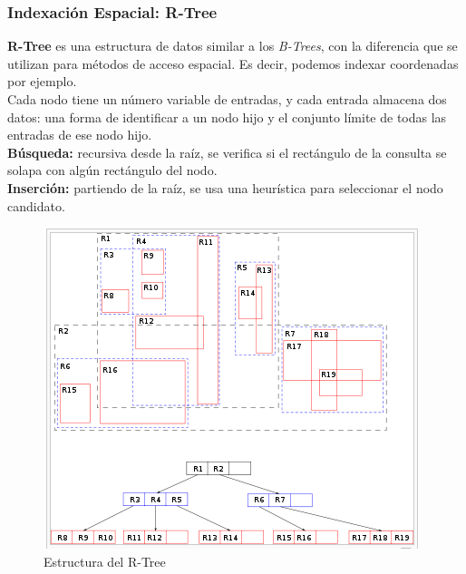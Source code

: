 \documentclass[a4paper,12pt,oneside]{report}
\begin{document}
\subsubsection*{Indexaci\'on Espacial: R-Tree}
\textbf{R-Tree} es una estructura de datos similar a los \textit{B-Trees}, con la diferencia que se utilizan para m\'etodos de acceso espacial. Es decir, podemos indexar coordenadas por ejemplo.\\
Cada nodo tiene un n\'umero variable de entradas, y cada entrada almacena dos datos: una forma de identificar a un nodo hijo y el conjunto l\'imite de todas las entradas de ese nodo hijo.\\
\textbf{B\'usqueda:} recursiva desde la ra\'iz, se verifica si el rect\'angulo de la consulta se solapa con alg\'un rect\'angulo del nodo.\\
\textbf{Inserci\'on:} partiendo de la ra\'iz, se usa una heur\'istica para seleccionar el nodo candidato.
\begin{figure}[h]
\begin{center}
\includegraphics[scale=0.5]{Imagenes/20.png}
\end{center}
\caption{Estructura del R-Tree}
\end{figure}
\end{document}

